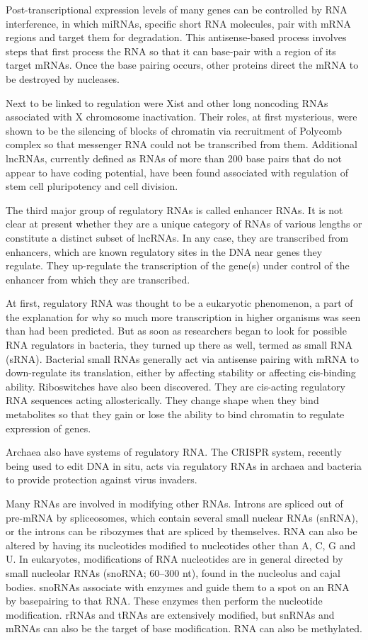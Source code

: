 Post-transcriptional expression levels of many genes can be controlled by RNA interference, in which miRNAs, specific short RNA molecules, pair with mRNA regions and target them for degradation. This antisense-based process involves steps that first process the RNA so that it can base-pair with a region of its target mRNAs. Once the base pairing occurs, other proteins direct the mRNA to be destroyed by nucleases.

Next to be linked to regulation were Xist and other long noncoding RNAs associated with X chromosome inactivation. Their roles, at first mysterious, were shown to be the silencing of blocks of chromatin via recruitment of Polycomb complex so that messenger RNA could not be transcribed from them. Additional lncRNAs, currently defined as RNAs of more than 200 base pairs that do not appear to have coding potential, have been found associated with regulation of stem cell pluripotency and cell division.

The third major group of regulatory RNAs is called enhancer RNAs. It is not clear at present whether they are a unique category of RNAs of various lengths or constitute a distinct subset of lncRNAs. In any case, they are transcribed from enhancers, which are known regulatory sites in the DNA near genes they regulate. They up-regulate the transcription of the gene(s) under control of the enhancer from which they are transcribed.

At first, regulatory RNA was thought to be a eukaryotic phenomenon, a part of the explanation for why so much more transcription in higher organisms was seen than had been predicted. But as soon as researchers began to look for possible RNA regulators in bacteria, they turned up there as well, termed as small RNA (sRNA). Bacterial small RNAs generally act via antisense pairing with mRNA to down-regulate its translation, either by affecting stability or affecting cis-binding ability. Riboswitches have also been discovered. They are cis-acting regulatory RNA sequences acting allosterically. They change shape when they bind metabolites so that they gain or lose the ability to bind chromatin to regulate expression of genes.

Archaea also have systems of regulatory RNA. The CRISPR system, recently being used to edit DNA in situ, acts via regulatory RNAs in archaea and bacteria to provide protection against virus invaders.

Many RNAs are involved in modifying other RNAs. Introns are spliced out of pre-mRNA by spliceosomes, which contain several small nuclear RNAs (snRNA), or the introns can be ribozymes that are spliced by themselves. RNA can also be altered by having its nucleotides modified to nucleotides other than A, C, G and U. In eukaryotes, modifications of RNA nucleotides are in general directed by small nucleolar RNAs (snoRNA; 60--300 nt), found in the nucleolus and cajal bodies. snoRNAs associate with enzymes and guide them to a spot on an RNA by basepairing to that RNA. These enzymes then perform the nucleotide modification. rRNAs and tRNAs are extensively modified, but snRNAs and mRNAs can also be the target of base modification. RNA can also be methylated.

